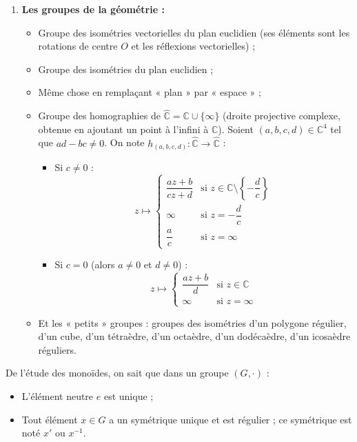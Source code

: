 \documentclass[a4paper,11pt]{article}
\newcommand{\C}{\mathbb{C}}
\begin{document}
\begin{exemples}
\begin{enumerate}
    \item \textbf{Les groupes de la géométrie :}
    \begin{itemize}
        \item Groupe des isométries vectorielles du plan euclidien (ses éléments sont les rotations de centre $O$ et les réflexions vectorielles) ;
        \item Groupe des isométries du plan euclidien ;
        \item Même chose en remplaçant « plan » par « espace » ;
        \item Groupe des homographies de $\hat{\C} = \C \cup \{\infty\}$ (droite projective complexe, obtenue en ajoutant un point à l'infini à $\C$). Soient $(a, b, c, d) \in \C^4$ tel que $ad - bc \neq 0$. On note $h_{(a, b, c, d)} : \hat{\C} \to \hat{\C}$ :
        \begin{itemize}
            \item Si $c \neq 0$ :
            \[
            z \longmapsto \begin{cases}
            \dfrac{az+b}{cz+d} & \text{si } z \in \C \setminus \left\{-\dfrac{d}{c}\right\} \\[1.2em]
            \infty & \text{si } z = -\dfrac{d}{c} \\[0.6em]
            \dfrac{a}{c} & \text{si } z = \infty
            \end{cases}
            \]
            \item Si $c = 0$ (alors $a \neq 0$ et $d \neq 0$) :
            \[
            z \longmapsto \begin{cases}
            \dfrac{az+b}{d} & \text{si } z \in \C \\[1em]
            \infty & \text{si } z = \infty
            \end{cases}
            \]
        \end{itemize}
        \item Et les « petits » groupes : groupes des isométries d'un polygone régulier, d'un cube, d'un tétraèdre, d'un octaèdre, d'un dodécaèdre, d'un icosaèdre réguliers.
    \end{itemize}
\end{enumerate}
\end{exemples}

De l'étude des monoïdes, on sait que dans un groupe $(G, \cdot)$ :
\begin{itemize}
    \item L'élément neutre $e$ est unique ;
    \item Tout élément $x \in G$ a un symétrique unique et est régulier ; ce symétrique est noté $x'$ ou $x^{-1}$.
\end{itemize}
\end{document}
